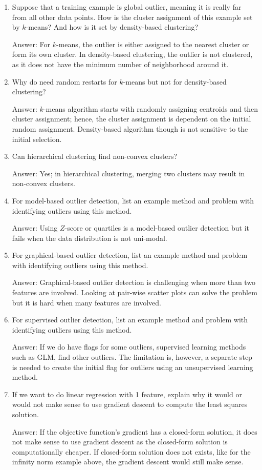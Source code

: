 \documentclass{article}
\newcommand{\gre}[1]{\textcolor{gre}{#1}}
\newcommand\ans[1]{\par\gre{Answer: #1}}
\begin{document}
\begin{enumerate}
\item Suppose that a training example is global outlier, meaning it is really far from all other data points. How is the cluster assignment of this example set by $k$-means? And how is it set by density-based clustering?

\ans{For $k$-means, the outlier is either assigned to the nearest cluster or form its own cluster. In density-based clustering, the outlier is not clustered, as it does not have the minimum number of neighborhood around it.}

\item Why do need random restarts for $k$-means but not for density-based clustering?

\ans{$k$-means algorithm starts with randomly assigning centroids and then cluster assignment; hence, the cluster assignment is dependent on the initial random assignment. Density-based algorithm though is not sensitive to the initial selection.}

\item Can hierarchical clustering find non-convex clusters?
\ans{Yes; in hierarchical clustering, merging two clusters may result in non-convex clusters.}

\item For model-based outlier detection, list an example method and problem with identifying outliers using this method.
\ans{Using $Z$-score or quartiles is a model-based outlier detection but it fails when the data distribution is not uni-modal.}

\item For graphical-based outlier detection, list an example method and problem with identifying outliers using this method.
\ans{Graphical-based outlier detection is challenging when more than two features are involved. Looking at pair-wise scatter plots can solve the problem but it is hard when many features are involved.}

\item For supervised outlier detection, list an example method and problem with identifying outliers using this method.
\ans{If we do have flags for some outliers, supervised learning methods such as GLM, find other outliers. The limitation is, however, a separate step is needed to create the initial flag for outliers using an unsupervised learning method.}

\item If we want to do linear regression with 1 feature, explain why it would or would not make sense to use gradient descent to compute the least squares solution.
\ans{If the objective function's gradient has a closed-form solution, it does not make sense to use gradient descent as the closed-form solution is computationally cheaper. If closed-form solution does not exists, like for the infinity norm example above, the gradient descent would still make sense.}


\end{enumerate}
\end{document}

